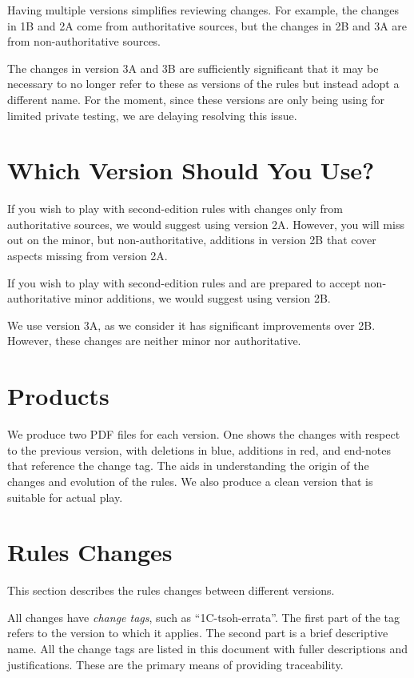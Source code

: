 \documentclass{report}
\begin{document}
Having multiple versions simplifies reviewing changes. For example, the changes in 1B and 2A come from authoritative sources, but the changes in 2B and 3A are from non-authoritative sources.

The changes in version 3A and 3B are sufficiently significant that it may be necessary to no longer refer to these as versions of the {\AirPow} rules but instead adopt a different name. For the moment, since these versions are only being using for limited private testing, we are delaying resolving this issue.

\section{Which Version Should You Use?}

If you wish to play with second-edition rules with changes only from authoritative sources, we would suggest using version 2A. However, you will miss out on the minor, but non-authoritative, additions in version 2B that cover aspects missing from version 2A.

If you wish to play with second-edition rules and are prepared to accept non-authoritative minor additions, we would suggest using version 2B.

We use version 3A, as we consider it has significant improvements over 2B. However, these changes are neither minor nor authoritative.

\section{Products}

We produce two PDF files for each version. One shows the changes with respect to the previous version, with deletions in blue, additions in red, and end-notes that reference the change tag. The aids in understanding the origin of the changes and evolution of the rules. We also produce a clean version that is suitable for actual play.

\section{Rules Changes}

This section describes the rules changes between different versions.

All changes have \emph{change tags}, such as “1C-tsoh-errata”. The first part of the tag refers to the version to which it applies. The second part is a brief descriptive name. All the change tags are listed in this document with fuller descriptions and justifications. These are the primary means of providing traceability.
\end{document}
